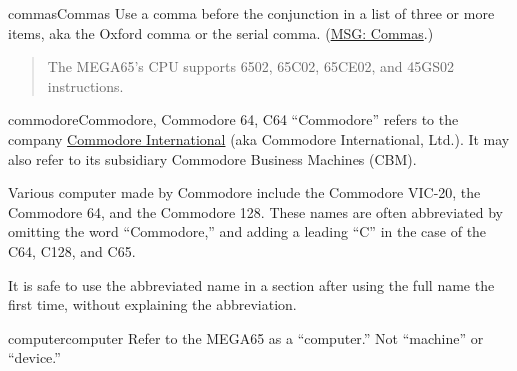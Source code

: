 \begin{sgentry}{commas}{Commas}
    Use a comma before the conjunction in a list of three or more items, aka the Oxford comma or the serial comma. (\href{https://learn.microsoft.com/en-us/style-guide/punctuation/commas}{MSG: Commas}.)

    \begin{quote}
        The MEGA65's CPU supports 6502, 65C02, 65CE02, and 45GS02 instructions.
    \end{quote}
\end{sgentry}

\begin{sgentry}{commodore}{Commodore, Commodore 64, C64}
    ``Commodore'' refers to the company \href{https://en.wikipedia.org/wiki/Commodore_International}{Commodore International} (aka Commodore International, Ltd.). It may also refer to its subsidiary Commodore Business Machines (CBM).

    Various computer made by Commodore include the Commodore VIC-20, the Commodore 64, and the Commodore 128. These names are often abbreviated by omitting the word ``Commodore,'' and adding a leading ``C'' in the case of the C64, C128, and C65.

    It is safe to use the abbreviated name in a section after using the full name the first time, without explaining the abbreviation.
\end{sgentry}

\begin{sgentry}{computer}{computer}
    Refer to the MEGA65 as a ``computer.'' Not ``machine'' or ``device.''
\end{sgentry}

